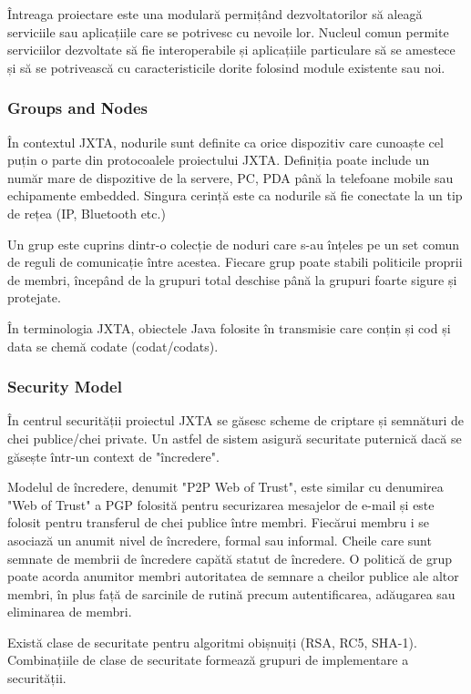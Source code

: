 Întreaga proiectare este una modulară permițând dezvoltatorilor să aleagă
serviciile sau aplicațiile care se potrivesc cu nevoile lor. Nucleul comun
permite serviciilor dezvoltate să fie interoperabile și aplicațiile
particulare să se amestece și să se potrivească cu caracteristicile dorite
folosind module existente sau noi.

\subsubsection{Groups and Nodes}

În contextul JXTA, nodurile sunt definite ca orice dispozitiv care cunoaște
cel puțin o parte din protocoalele proiectului JXTA. Definiția poate include
un număr mare de dispozitive de la servere, PC, PDA până la telefoane mobile
sau echipamente embedded. Singura cerință este ca nodurile să fie conectate la
un tip de rețea (IP, Bluetooth etc.)

Un grup este cuprins dintr-o colecție de noduri care s-au înțeles pe un set
comun de reguli de comunicație între acestea. Fiecare grup poate stabili
politicile proprii de membri, începând de la grupuri total deschise până la
grupuri foarte sigure și protejate.

În terminologia JXTA, obiectele Java folosite în transmisie care conțin și cod
și data se chemă codate (codat/codats).

\subsubsection{Security Model}

În centrul securității proiectul JXTA se găsesc scheme de criptare și
semnături de chei publice/chei private. Un astfel de sistem asigură securitate
puternică dacă se găsește într-un context de "încredere".

Modelul de încredere, denumit "P2P Web of Trust", este similar cu denumirea
"Web of Trust" a PGP folosită pentru securizarea mesajelor de e-mail și este
folosit pentru transferul de chei publice între membri. Fiecărui membru i se
asociază un anumit nivel de încredere, formal sau informal. Cheile care sunt
semnate de membrii de încredere capătă statut de încredere. O politică de grup
poate acorda anumitor membri autoritatea de semnare a cheilor publice ale
altor membri, în plus față de sarcinile de rutină precum autentificarea,
adăugarea sau eliminarea de membri.

Există clase de securitate pentru algoritmi obișnuiți (RSA, RC5, SHA-1).
Combinațiile de clase de securitate formează grupuri de implementare a
securității.

